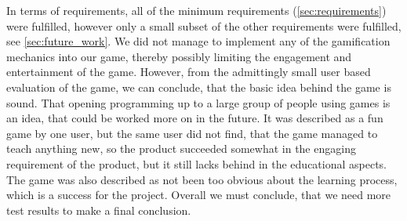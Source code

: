 In terms of requirements, all of the minimum requirements (\autoref{sec:requirements}) were fulfilled, however only a small subset of the other requirements were fulfilled, see \autoref{sec:future_work}.
We did not manage to implement any of the gamification mechanics into our game, thereby possibly limiting the engagement and entertainment of the game. However, from the admittingly small user based evaluation of the game, we can conclude, that the basic idea behind the game is sound. That opening programming up to a large group of people using games is an idea, that could be worked more on in the future. It was described as a fun game by one user, but the same user did not find, that the game managed to teach anything new, so the product succeeded somewhat in the engaging requirement of the product, but it still lacks behind in the educational aspects. The game was also described as not been too obvious about the learning process, which is a success for the project. Overall we must conclude, that we need more test results to make a final conclusion.